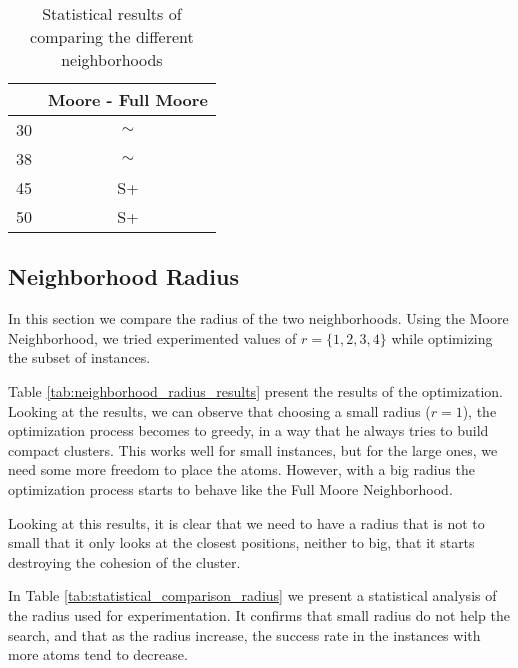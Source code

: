 		\begin{table}[!htdp]
				\begin{center}
					\begin{tabular}{| c | c |}
						\hline
						~ & \textbf{Moore - Full Moore} \\ \hline
						30 & $\sim$ \\ \hline
						38 & $\sim$ \\ \hline
						45 & S+ \\ \hline
						50 & S+ \\ \hline
					\end{tabular}
					\caption{Statistical results of comparing the different neighborhoods}
					\label{tab:statistical_comparison_neighborhoods}
				\end{center}
		\end{table}
		
		\pagebreak
		\subsection{Neighborhood Radius}
		
		In this section we compare the radius of the two neighborhoods. Using the Moore Neighborhood, we tried experimented values of $r = \{1, 2, 3, 4\}$ while optimizing the subset of instances.
		
		Table \ref{tab:neighborhood_radius_results} present the results of the optimization. Looking at the results, we can observe that choosing a small radius ($r=1$), the optimization process becomes to greedy, in a way that he always tries to build compact clusters. This works well for small instances, but for the large ones, we need some more freedom to place the atoms. However, with a big radius the optimization process starts to behave like the Full Moore Neighborhood. 
		
		Looking at this results, it is clear that we need to have a radius that is not to small that it only looks at the closest positions, neither to big, that it starts destroying the cohesion of the cluster.
		
		In Table \ref{tab:statistical_comparison_radius} we present a statistical analysis of the radius used for experimentation. It confirms that small radius do not help the search, and that as the radius increase, the success rate in the instances with more atoms tend to decrease.
		
